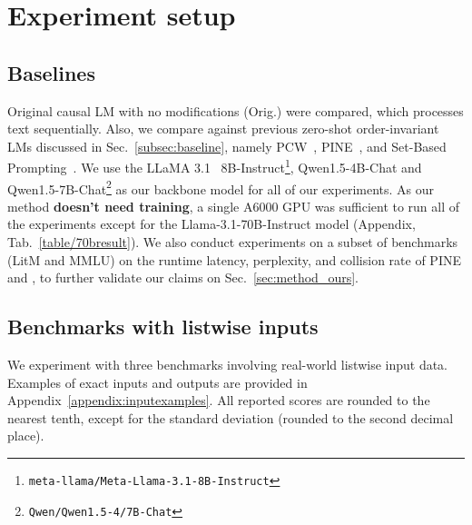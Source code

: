 \section{Experiment setup}




\subsection{Baselines}
\label{sec:ablations}
Original causal LM with no modifications (Orig.) were compared, which processes text sequentially. Also, we compare \ours{} against previous zero-shot order-invariant LMs discussed in Sec.~\ref{subsec:baseline}, namely PCW~\cite{pcw}, PINE~\cite{pine}, and Set-Based Prompting~\cite{setbasedprompting}.
We use the LLaMA 3.1~\cite{llama3} 8B-Instruct\footnote{\texttt{meta-llama/Meta-Llama-3.1-8B-Instruct}}, Qwen1.5-4B-Chat and Qwen1.5-7B-Chat\footnote{\texttt{Qwen/Qwen1.5-4/7B-Chat}} as our backbone model for all of our experiments. As our method \textbf{doesn't need training}, a single A6000 GPU was sufficient to run all of the experiments except for the Llama-3.1-70B-Instruct model (Appendix, Tab.~\ref{table/70bresult}).
We also conduct experiments on a subset of benchmarks (LitM and MMLU) on the runtime latency, perplexity, and collision rate of PINE and \ours{}, to further validate our claims on Sec.~\ref{sec:method_ours}.

\subsection{Benchmarks with listwise inputs}\label{sec:benchmarks}

We experiment with three benchmarks involving real-world listwise input data.
Examples of exact inputs and outputs are provided in Appendix~\ref{appendix:inputexamples}.
All reported scores are rounded to the nearest tenth, except for the standard deviation (rounded to the second decimal place). 


